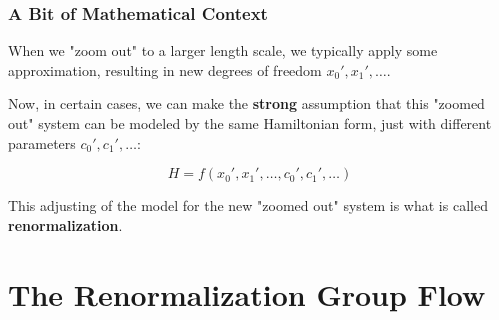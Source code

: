 \documentclass[aspectratio=169, 12pt]{beamer}
\begin{document}
\begin{frame}

    \frametitle{A Bit of Mathematical Context}

    When we "zoom out" to a larger length scale, we typically apply some approximation, resulting in new degrees of freedom $x_0', x_1', \dots$. 

    \vspace{1em}

    Now, in certain cases, we can make the \textbf{strong} assumption that this "zoomed out" system can be modeled by the same Hamiltonian form, just with different parameters $c_0', c_1', \dots$:

    \[H = f(x_0', x_1', \dots, c_0', c_1', \dots)\]

    This adjusting of the model for the new "zoomed out" system is what is called \textbf{renormalization}. 
    
\end{frame}

\section{The Renormalization Group Flow}
\end{document}
